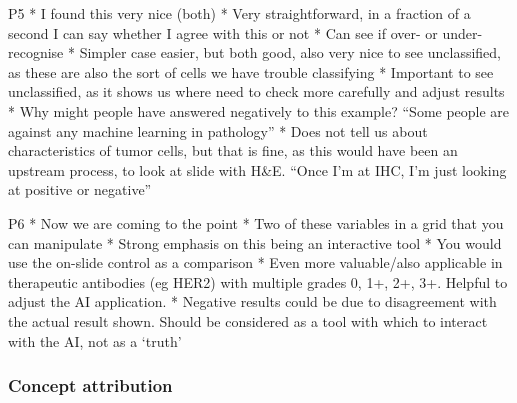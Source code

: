 
P5
* I found this very nice (both)
* Very straightforward, in a fraction of a second I can say whether I agree with this or not
* Can see if over- or under-recognise
* Simpler case easier, but both good, also very nice to see unclassified, as these are also the sort of cells we have trouble classifying
* Important to see unclassified, as it shows us where need to check more carefully and adjust results
* Why might people have answered negatively to this example? “Some people are against any machine learning in pathology”
* Does not tell us about characteristics of tumor cells, but that is fine, as this would have been an upstream process, to look at slide with H&E. “Once I’m at IHC, I’m just looking at positive or negative”

P6
* Now we are coming to the point
* Two of these variables in a grid that you can manipulate
* Strong emphasis on this being an interactive tool
* You would use the on-slide control as a comparison
* Even more valuable/also applicable in therapeutic antibodies (eg HER2) with multiple grades 0, 1+, 2+, 3+. Helpful to adjust the AI application.
* Negative results could be due to disagreement with the actual result shown. Should be considered as a tool with which to interact with the AI, not as a ‘truth’


\subsubsection{Concept attribution}


